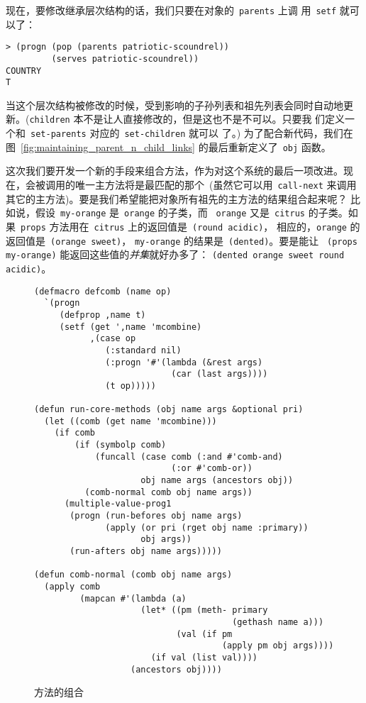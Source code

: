现在，要修改继承层次结构的话，我们只要在对象的~\texttt{parents} 上调
用~\texttt{setf} 就可以了：
\begin{lstlisting}
> (progn (pop (parents patriotic-scoundrel))
         (serves patriotic-scoundrel))
COUNTRY
T
\end{lstlisting}
当这个层次结构被修改的时候，受到影响的子孙列表和祖先列表会同时自动地更
新。(\texttt{children} 本不是让人直接修改的，但是这也不是不可以。只要我
们定义一个和~\texttt{set-parents} 对应的~\texttt{set-children} 就可以
了。) 为了配合新代码，我们在图~\ref{fig:maintaining_parent_n_child_links} 
的最后重新定义了~\verb|obj| 函数。

这次我们要开发一个新的手段来组合方法，作为对这个系统的最后一项改进。现
在，会被调用的唯一主方法将是最匹配的那个~(虽然它可以用~\texttt{call-next} 
来调用其它的主方法)。要是我们希望能把对象所有祖先的主方法的结果组合起来呢？
比如说，假设~\texttt{my-orange} 是~\texttt{orange} 的子类，而
~\texttt{orange} 又是~\texttt{citrus} 的子类。如果~\texttt{props} 
方法用在~\texttt{citrus} 上的返回值是~\texttt{(round acidic)}，
相应的，\texttt{orange} 的返回值是~\texttt{(orange sweet)}，
\texttt{my-orange} 的结果是~\texttt{(dented)}。要是能让
~\texttt{(props my-orange)} 能返回这些值的\emph{并集}就好办多了：
\texttt{(dented orange sweet round acidic)}。

\begin{figure}
\begin{lstlisting}
(defmacro defcomb (name op)
  `(progn
     (defprop ,name t)
     (setf (get ',name 'mcombine)
           ,(case op
              (:standard nil)
              (:progn '#'(lambda (&rest args)
                           (car (last args))))
              (t op)))))

(defun run-core-methods (obj name args &optional pri)
  (let ((comb (get name 'mcombine)))
    (if comb
        (if (symbolp comb)
            (funcall (case comb (:and #'comb-and)
                           (:or #'comb-or))
                     obj name args (ancestors obj))
          (comb-normal comb obj name args))
      (multiple-value-prog1
       (progn (run-befores obj name args)
              (apply (or pri (rget obj name :primary))
                     obj args))
       (run-afters obj name args)))))

(defun comb-normal (comb obj name args)
  (apply comb
         (mapcan #'(lambda (a)
                     (let* ((pm (meth- primary
                                       (gethash name a)))
                            (val (if pm
                                     (apply pm obj args))))
                       (if val (list val))))
                   (ancestors obj))))
\end{lstlisting}
\caption{\label{fig:method_combination}方法的组合}
\end{figure}

